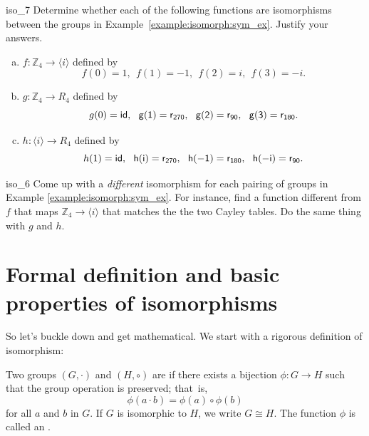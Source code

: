  

 \begin{exercise}{iso_7}
 Determine whether each of the following functions are isomorphisms between the groups in Example~\ref{example:isomorph:sym_ex}. Justify your answers. 
 \begin{enumerate}[(a)]
 \item
 $ f: {\mathbb Z_4}  \longrightarrow \langle i \rangle$ defined by 
\[  
f(0) = 1,~~
 f(1) = -1,~~
 f(2) = i,~~
 f(3) = -i.
\]
 
 \item
$ g: {\mathbb Z_4}  \longrightarrow R_4$ defined by 
\[ 
g(0) = \sf{id},~~
 g(1) = r_{270},~~
 g(2) = r_{90} ,~~
 g(3) = r_{180}. 
 \]

 \item
 $ h: \langle i \rangle \longrightarrow R_4$ defined by 
\[ 
 h(1) = \sf{id},~~ 
h(i) = r_{270},~~
h(-1) = r_{180},~~
 h(-i) = r_{90}.
\]
 \end{enumerate}
 \end{exercise}

 \begin{exercise}{iso_6}
 Come up with a \emph{different} isomorphism for each pairing of groups in Example \ref{example:isomorph:sym_ex}. For instance, find a  function  different from $f$ that maps ${\mathbb Z_4} \longrightarrow \langle i \rangle$  that matches the the two Cayley tables. Do the same thing with $g$ and $h$.
 \end{exercise}
  
\section{Formal definition and basic properties of isomorphisms}
So let's buckle down and get mathematical. We start with a rigorous definition of isomorphism:

\begin{defn}\label{isomorph_defn}
Two groups $(G, \cdot)$ and $(H, \circ)$ are  if there exists a bijection $\phi : G \rightarrow H$ such that the group operation is preserved;  that~is, 
\[
\phi( a \cdot b) = \phi( a) \circ \phi( b)
\]
for all $a$ and $b$ in $G$. If $G$ is isomorphic to $H$, we write $G \cong H$. The function $\phi$ is called an . 
\end{defn}

